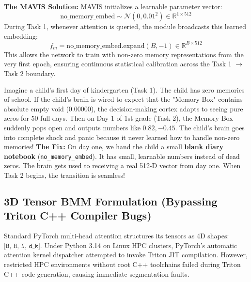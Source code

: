 \documentclass[11pt,a4paper]{article}
\newcommand{\dimtensor}[1]{\texttt{[#1]}}
\begin{document}
\textbf{The MAVIS Solution:} MAVIS initializes a learnable parameter vector:
\begin{equation}
\text{no\_memory\_embed} \sim \mathcal{N}(0, 0.01^2) \in \mathbb{R}^{1 \times 512}
\end{equation}
During Task 1, whenever attention is queried, the module broadcasts this learned embedding:
\begin{equation}
f_m = \text{no\_memory\_embed}.\text{expand}(B, -1) \in \mathbb{R}^{B \times 512}
\end{equation}
This allows the network to train with non-zero memory representations from the very first epoch, ensuring continuous statistical calibration across the Task 1 $\to$ Task 2 boundary.

\begin{callout}
Imagine a child's first day of kindergarten (Task 1). The child has zero memories of school.
If the child's brain is wired to expect that the "Memory Box" contains absolute empty void ($0.00000$), the decision-making cortex adapts to seeing pure zeros for 50 full days.\newline
Then on Day 1 of 1st grade (Task 2), the Memory Box suddenly pops open and outputs numbers like $0.82, -0.45$. The child's brain goes into complete shock and panic because it never learned how to handle non-zero memories!\newline
\textbf{The Fix:} On day one, we hand the child a small \textbf{blank diary notebook} (\texttt{no\_memory\_embed}). It has small, learnable numbers instead of dead zeros. The brain gets used to receiving a real 512-D vector from day one. When Task 2 begins, the transition is seamless!
\end{callout}

\subsection{3D Tensor BMM Formulation (Bypassing Triton C++ Compiler Bugs)}
Standard PyTorch multi-head attention structures its tensors as 4D shapes: $\dimtensor{B, H, N, d_k}$. Under Python 3.14 on Linux HPC clusters, PyTorch's automatic attention kernel dispatcher attempted to invoke Triton JIT compilation. However, restricted HPC environments without root C++ toolchains failed during Triton C++ code generation, causing immediate segmentation faults.
\end{document}
